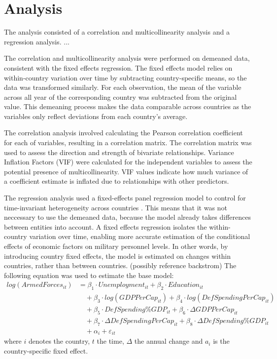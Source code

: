 \section{Analysis}

The analysis consisted of a correlation and multicollinearity analysis and a regression analysis. ...

The correlation and multicollinearity analysis were performed on demeaned data, consistent 
with the fixed effects regression. The fixed effects model relies on within-country variation 
over time by subtracting country-specific means, so the data was transformed similarly. For 
each observation, the mean of the variable across all year of the corresponding country was 
subtracted from the original value. This demeaning process makes the data comparable across 
countries as the variables only reflect deviations from each country's average. 

The correlation analysis involved calculating the Pearson correlation coefficient for each 
of variables, resulting in a correlation matrix. The correlation matrix was used to assess the 
direction and strength of bivariate relationships.
Variance Inflation Factors (VIF) were calculated for the independent variables to 
assess the potential presence of multicollinearity. VIF values indicate how much variance
of a coefficient estimate is inflated due to relationships with other predictors.

The regression analysis used a fixed-effects panel regression model to control for time-invariant 
heterogeneity across countries \parencite{backstrom_are_2019}. This means that it was not 
neccessary to 
use the demeaned data, because the model already takes differences between entities into account.
A fixed effects regression isolates the within-country variation over time, enabling more accurate 
estimation of the conditional effects of economic factors on military personnel levels.
In other words, by introducing country fixed effects, the model is estimated on changes within 
countries, rather than between countries. (possibly reference backstrom) 
The following equation was used to estimate the base model:
\begin{align*}
log(ArmedForces_{it}) &= \beta_1 \cdot Unemployment_{it} 
+ \beta_2 \cdot Education_{it} \\
&\quad + \beta_3 \cdot log(GDPPerCap_{it}) 
+ \beta_4 \cdot log(DefSpendingPerCap_{it}) \\
&\quad + \beta_5 \cdot DefSpending\%GDP_{it} 
+ \beta_6 \cdot \Delta GDPPerCap_{it} \\
&\quad + \beta_7 \cdot \Delta DefSpendingPerCap_{it} 
+ \beta_8 \cdot \Delta DefSpending\%GDP_{it} \\
&\quad + \alpha_i + \varepsilon_{it}
\end{align*}
where $i$ denotes the country, $t$ the time, $\Delta$ the annual change and 
$a_i$ is the country-specific fixed effect.

